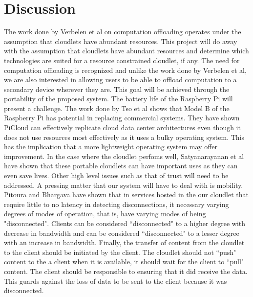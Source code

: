 \section{Discussion}
The work done by Verbelen et al\cite{RefWorks:93} on computation offloading operates under the assumption that cloudlets have abundant resources.
This project will do away with the assumption that cloudlets have abundant resources and determine which technologies are suited for a resource constrained cloudlet, if any. The need for computation offloading is recognized and unlike the work done by Verbelen et al\cite{RefWorks:93}, we are also interested in  allowing users to be able to offload computation to a secondary device wherever they are. This goal will be achieved through the portability of the proposed system. The battery life of the Raspberry Pi will present a challenge. The work done by Tso et al\cite{tso2013glasgow} shows that Model B of the Raspberry Pi has potential in replacing commercial systems. They have shown PiCloud can effectively replicate cloud data center architectures even though it does not use resources most effectively as it uses a bulky operating system. This has the implication that a more lightweight operating system may offer improvement. In the case where the cloudlet perfoms well, Satyanarayanan et al\cite{RefWorks:107} have shown that these portable cloudlets can have important uses as they can even save lives. Other high level issues such as that of trust will need to be addressed. A pressing matter that our system will have to deal with is mobility. Pitoura and Bhargava\cite{pitoura1993dealing} have shown that in services hosted in the our cloudlet that require little to no latency in detecting disconnections, it necessary varying degrees of modes of operation, that is, have varying modes of being "disconnected". Clients can be considered ``disconnected" to a higher degree with decrease in bandwidth and can be considered ``disconnected" to a lesser degree with an increase in bandwidth. Finally, the transfer of content from the cloudlet to the client should be initiated by the client. The cloudlet should not ``push" content to the a client when it is available, it should wait for the client to ``pull" content. The client should be responsible to ensuring that it did receive the data. This guards against the loss of data to be sent to the client because it was disconnected.


